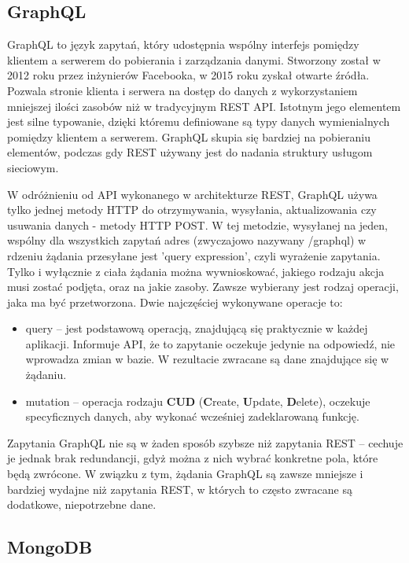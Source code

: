 \documentclass[12pt,twoside]{article}
\begin{document}
\subsection{GraphQL}

GraphQL to język zapytań, który udostępnia wspólny interfejs pomiędzy klientem a serwerem do pobierania i zarządzania danymi. Stworzony został w 2012 roku przez inżynierów Facebooka, w 2015 roku zyskał otwarte źródła. Pozwala stronie klienta i serwera na dostęp do danych z wykorzystaniem mniejszej ilości zasobów niż w tradycyjnym REST API. Istotnym jego elementem jest silne typowanie, dzięki któremu definiowane są typy danych wymienialnych pomiędzy klientem a serwerem. GraphQL skupia się bardziej na pobieraniu elementów, podczas gdy REST używany jest do nadania struktury usługom sieciowym. 

W odróżnieniu od API wykonanego w architekturze REST, GraphQL używa tylko jednej metody HTTP do otrzymywania, wysyłania, aktualizowania czy usuwania danych - metody HTTP POST. W tej metodzie, wysyłanej na jeden, wspólny dla wszystkich zapytań adres (zwyczajowo nazywany /graphql) w rdzeniu żądania przesyłane jest 'query expression', czyli wyrażenie zapytania. Tylko i wyłącznie z ciała żądania można wywnioskować, jakiego rodzaju akcja musi zostać podjęta, oraz na jakie zasoby. Zawsze wybierany jest rodzaj operacji, jaka ma być przetworzona. Dwie najczęściej wykonywane operacje to:
\begin{itemize}
	\item query – jest podstawową operacją, znajdującą się praktycznie w każdej aplikacji. Informuje API, że to zapytanie oczekuje jedynie na odpowiedź, nie wprowadza zmian w bazie. W rezultacie zwracane są dane znajdujące się w żądaniu.
	\item mutation – operacja rodzaju \textbf{CUD} (\textbf{C}reate, \textbf{U}pdate, \textbf{D}elete), oczekuje specyficznych danych,
aby wykonać wcześniej zadeklarowaną funkcję.
\end{itemize} 
Zapytania GraphQL nie są w żaden sposób szybsze niż zapytania REST -- cechuje je jednak brak redundancji, gdyż można z nich wybrać konkretne pola, które będą zwrócone. W związku z tym, żądania GraphQL są zawsze mniejsze i bardziej wydajne niż zapytania REST, w których to często zwracane są dodatkowe, niepotrzebne dane.

\subsection{MongoDB}
\end{document}
